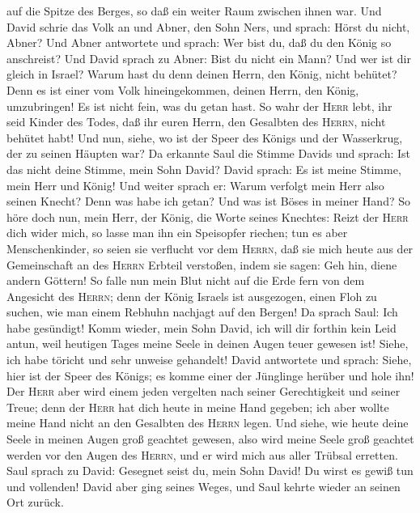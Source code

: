 auf die Spitze des Berges, so daß ein weiter Raum zwischen ihnen war.
 Und David schrie das Volk an und Abner, den Sohn Ners,
und sprach: Hörst du nicht, Abner? Und Abner antwortete und sprach: Wer
bist du, daß du den König so anschreist?  Und David
sprach zu Abner: Bist du nicht ein Mann? Und wer ist dir gleich in
Israel? Warum hast du denn deinen Herrn, den König, nicht behütet? Denn
es ist einer vom Volk hineingekommen, deinen Herrn, den König,
umzubringen!  Es ist nicht fein, was du getan hast. So
wahr der \textsc{Herr} lebt, ihr seid Kinder des Todes, daß ihr euren
Herrn, den Gesalbten des \textsc{Herrn}, nicht behütet habt! Und nun,
siehe, wo ist der Speer des Königs und der Wasserkrug, der zu seinen
Häupten war?  Da erkannte Saul die Stimme Davids und
sprach: Ist das nicht deine Stimme, mein Sohn David? David sprach: Es
ist meine Stimme, mein Herr und König!  Und weiter sprach
er: Warum verfolgt mein Herr also seinen Knecht? Denn was habe ich
getan? Und was ist Böses in meiner Hand?  So höre doch
nun, mein Herr, der König, die Worte seines Knechtes: Reizt der
\textsc{Herr} dich wider mich, so lasse man ihn ein Speisopfer riechen;
tun es aber Menschenkinder, so seien sie verflucht vor dem
\textsc{Herrn}, daß sie mich heute aus der Gemeinschaft an des
\textsc{Herrn} Erbteil verstoßen, indem sie sagen: Geh hin, diene andern
Göttern!  So falle nun mein Blut nicht auf die Erde fern
von dem Angesicht des \textsc{Herrn}; denn der König Israels ist
ausgezogen, einen Floh zu suchen, wie man einem Rebhuhn nachjagt auf den
Bergen!  Da sprach Saul: Ich habe gesündigt! Komm wieder,
mein Sohn David, ich will dir forthin kein Leid antun, weil heutigen
Tages meine Seele in deinen Augen teuer gewesen ist! Siehe, ich habe
töricht und sehr unweise gehandelt!  David antwortete und
sprach: Siehe, hier ist der Speer des Königs; es komme einer der
Jünglinge herüber und hole ihn!  Der \textsc{Herr} aber
wird einem jeden vergelten nach seiner Gerechtigkeit und seiner Treue;
denn der \textsc{Herr} hat dich heute in meine Hand gegeben; ich aber
wollte meine Hand nicht an den Gesalbten des \textsc{Herrn} legen.
 Und siehe, wie heute deine Seele in meinen Augen groß
geachtet gewesen, also wird meine Seele groß geachtet werden vor den
Augen des \textsc{Herrn}, und er wird mich aus aller Trübsal erretten.
 Saul sprach zu David: Gesegnet seist du, mein Sohn
David! Du wirst es gewiß tun und vollenden! David aber ging seines
Weges, und Saul kehrte wieder an seinen Ort zurück.

